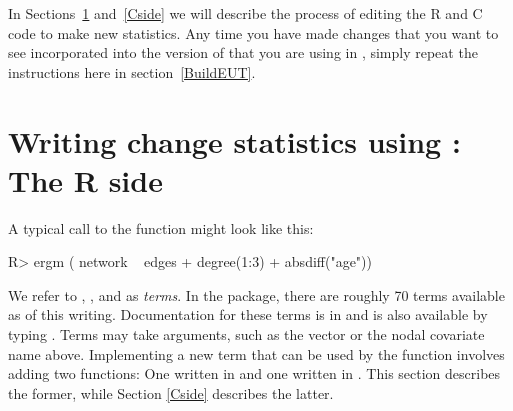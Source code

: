\documentclass[nojss]{jss}
\begin{document}
In Sections~\ref{Rside} and~\ref{Cside} we will describe the process of editing the R and C code to make new statistics.  Any time you have made changes that you want to see incorporated into the version of  that you are using in , simply repeat the instructions here in section~\ref{BuildEUT}.

\section[Writing change statistics using ergm.userterms:  The R side]%
{Writing change statistics using :  The R side}
\label{Rside}

A typical call to the  function might look like this:
\begin{CodeChunk}
\begin{CodeInput}
R> ergm ( network ~ edges + degree(1:3) + absdiff("age"))
\end{CodeInput}
\end{CodeChunk}
We refer to , , and  as {\em terms}.
In the  package, there are roughly 70 terms available
as of this writing.
Documentation for these terms is
 in \citet{ergmtermsjss} and is also available by typing .
 Terms may take arguments, such as the vector  or the nodal covariate
 name  above.  Implementing a new term that can be used by
 the  function involves adding two functions:  One written in 
 and one written in .  This section describes the former, while Section \ref{Cside}
 describes the latter.
\end{document}

